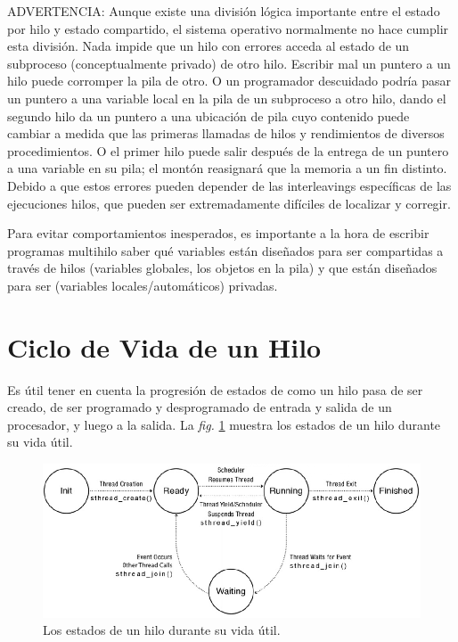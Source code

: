 \documentclass[10pt]{book}
\begin{document}
ADVERTENCIA: Aunque existe una división lógica importante entre el estado por hilo y estado compartido, el sistema operativo normalmente no hace cumplir esta división. Nada impide que un hilo con errores acceda al estado de un subproceso (conceptualmente privado) de otro hilo. Escribir mal un puntero a un hilo puede corromper la pila de otro. O un programador descuidado podría pasar un puntero a una variable local en la pila de un subproceso a otro hilo, dando el segundo hilo da un puntero a una ubicación de pila cuyo contenido puede cambiar a medida que las primeras llamadas de hilos y rendimientos de diversos procedimientos. O el primer hilo puede salir después de la entrega de un puntero a una variable en su pila; el montón reasignará que la memoria a un fin distinto. Debido a que estos errores pueden depender de las interleavings específicas de las ejecuciones hilos, que pueden ser extremadamente difíciles de localizar y corregir.

Para evitar comportamientos inesperados, es importante a la hora de escribir programas multihilo saber qué variables están diseñados para ser compartidas a través de hilos (variables globales, los objetos en la pila) y que están diseñados para ser (variables locales/automáticos) privadas.

\section{Ciclo de Vida de un Hilo}
Es útil tener en cuenta la progresión de estados de como un hilo pasa de ser creado, de ser programado y desprogramado de entrada y salida de un procesador, y luego a la salida. La \textit{fig.} \ref{fig0403} muestra los estados de un hilo durante su vida útil.
\begin{figure}[tbhp]
\centerline{\includegraphics[scale=0.45]{img/fig0403}}
\caption{Los estados de un hilo durante su vida útil.}
\label{fig0403}
\end{figure}
\end{document}
